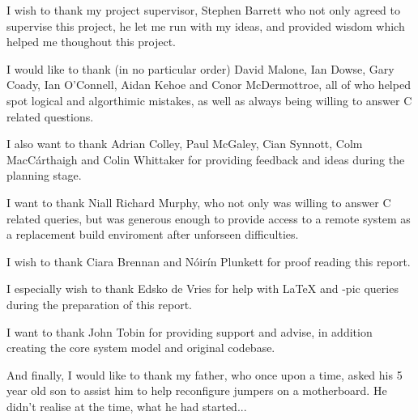 
I wish to thank my project supervisor, Stephen Barrett who not only
agreed to supervise this project, he let me run with my ideas, and 
provided wisdom which helped me thoughout this project.

\vspace{5mm}

I would like to thank (in no particular order) David Malone, 
Ian Dowse, Gary Coady, Ian O'Connell, Aidan Kehoe and 
Conor McDermottroe, all of who helped spot logical and algorthimic 
mistakes, as well as always being willing to answer C related 
questions.


I also want to thank Adrian Colley, Paul McGaley, Cian Synnott, Colm
MacC\'{a}rthaigh and Colin Whittaker for providing feedback and ideas 
during the planning stage.


I want to thank Niall Richard Murphy, who not only was willing to answer
C related queries, but was generous enough to provide access to a remote
system as a replacement build enviroment after unforseen difficulties.

\vspace{5mm}

I wish to thank Ciara Brennan and N\'{o}ir\'{i}n Plunkett for proof
reading this report. 


I especially wish to thank Edsko de Vries for help with
\textrm{\LaTeX{}}  and \textrm{\Xy-pic} queries during the preparation 
of this report.

\vspace{5mm}

I want to thank John Tobin for providing support and advise, in 
addition creating the core system model and original codebase.

\vspace{5mm}

And finally, I would like to thank my father, who once upon a time, 
asked his 5 year old son to assist him to help reconfigure jumpers on
a motherboard. He didn't realise at the time, what he had started...
